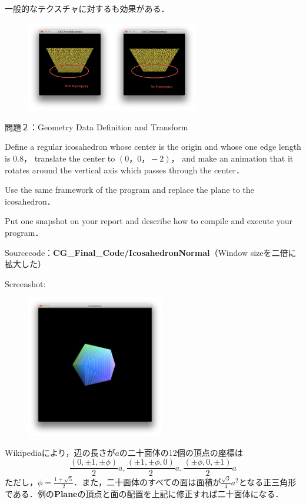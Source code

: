 \documentclass[a4paper,11pt]{jsarticle}
\numberwithin{theorem}{section}  %
\numberwithin{equation}{section} %
\begin{document}
\begin{enumerate}
一般的なテクスチャに対するも効果がある．

\begin{figure}[H]
\includegraphics[bb=0 0 444 451,width=7.5cm]{mip_mapping.pdf}
\end{figure}



\end{enumerate}
\newpage

\begin{itembox}[l]{問題２：Geometry Data Definition and Transform}

Define a regular icosahedron whose center is the origin and whose one edge length is $0.8$， translate the center to
$(0，0，-2)$， and make an animation that it rotates around the vertical axis which passes through the center．

Use the same framework of the program and replace the plane to the icosahedron．

Put one snapshot on your report and describe how to compile and execute your program．
\end{itembox}

Sourcecode：{\bf CG\_Final\_Code/IcosahedronNormal}（Window sizeを二倍に拡大した）

Screenshot:
\begin{figure}[H]
\includegraphics[bb=0 0 444 751,width=6cm]{Icosahedron.pdf}\\
\end{figure}

Wikipediaにより，辺の長さが$a$の二十面体の12個の頂点の座標は
\[
\frac{(0,\pm 1,\pm \phi)}{2}a,\frac{(\pm 1, \pm \phi,0)}{2}a,\frac{(\pm \phi, 0, \pm 1)}{2}a
\]
ただし，$\phi = \frac{1+\sqrt{5}}{2}$．また，二十面体のすべての面は面積が$\frac{\sqrt{3}}{4}a^2$となる正三角形である．例の{\bf Plane}の頂点と面の配置を上記に修正すれば二十面体になる．
\end{document}
